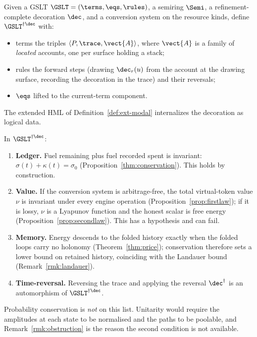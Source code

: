 \begin{construction}
\label{con:main}
Given a GSLT $\GSLT = (\terms, \eqs, \rules)$, a semiring $\Semi$, a
refinement-complete decoration $\dec$, and a conversion system on the
resource kinds, define $\GSLT^{\dagger\dec}$ with:
\begin{itemize}[itemsep=2pt]
  \item terms the triples $\langle P, \trace, \vect{A}\rangle$, where
        $\vect{A}$ is a family of \emph{located} accounts, one per surface
        holding a stack;
  \item rules the forward steps (drawing $\dec_r(u)$ from the account at
        the drawing surface, recording the decoration in the trace) and
        their reversals;
  \item $\eqs$ lifted to the current-term component.
\end{itemize}
The extended HML of Definition~\ref{def:ext-modal} internalizes the
decoration as logical data.
\end{construction}

\begin{theorem}
In $\GSLT^{\dagger\dec}$:
\begin{enumerate}[label=(\roman*)]
  \item \textbf{Ledger.}  Fuel remaining plus fuel recorded spent is
        invariant: $\sigma(t) + \kappa(t) = \sigma_0$
        (Proposition~\ref{thm:conservation}).  This holds by construction.
  \item \textbf{Value.}  If the conversion system is arbitrage-free, the
        total virtual-token value $\nu$ is invariant under every engine
        operation (Proposition~\ref{prop:firstlaw}); if it is lossy, $\nu$
        is a Lyapunov function and the honest scalar is free energy
        (Proposition~\ref{prop:secondlaw}).  This has a hypothesis and can
        fail.
  \item \textbf{Memory.}  Energy descends to the folded history exactly
        when the folded loops carry no holonomy
        (Theorem~\ref{thm:price}); conservation therefore sets a lower
        bound on retained history, coinciding with the Landauer bound
        (Remark~\ref{rmk:landauer}).
  \item \textbf{Time-reversal.}  Reversing the trace and applying the
        reversal $\dec^{\dagger}$ is an automorphism of
        $\GSLT^{\dagger\dec}$.
\end{enumerate}
Probability conservation is \emph{not} on this list.  Unitarity would
require the amplitudes at each state to be normalised and the paths to be
poolable, and Remark~\ref{rmk:obstruction} is the reason the second
condition is not available.
\end{theorem}

